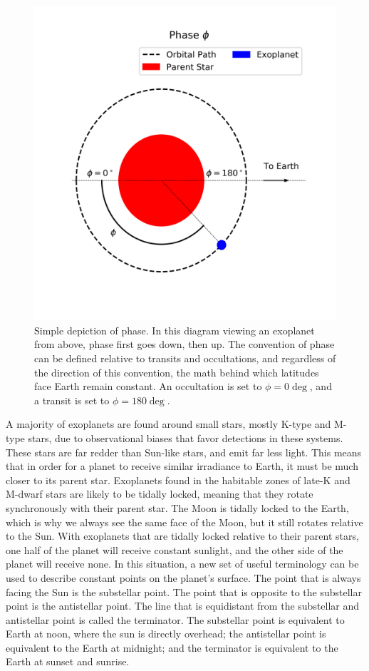 \begin{figure}[ht]
    \centering
    \includegraphics[width=5in]{background/phase_diagram.png}
    \caption[Definition of Phase]{Simple depiction of phase. In this diagram
    viewing an exoplanet from above, phase first goes down, then up.
    The convention of phase
    can be defined relative to transits and occultations, and regardless of the
    direction of this convention, the math behind which latitudes face Earth
    remain constant. An occultation is set to $\phi=0\deg$, and a transit is
    set to $\phi=180\deg$.}
    \label{phasediagram}
\end{figure}

A majority of exoplanets are found around small
 stars, mostly K-type and M-type stars, due to observational biases that favor
 detections in these systems. These stars are far redder than Sun-like stars,
 and emit far less light. This means that in order for a planet to receive
 similar irradiance to Earth, it must be much closer to its parent star. Exoplanets
 found in the habitable zones of late-K and M-dwarf stars are likely to be
 tidally locked, meaning that they rotate synchronously with their parent star.
 The Moon is tidally locked to the Earth, which is why we always see the same
 face of the Moon, but it still rotates relative to the Sun. With exoplanets
 that are tidally locked relative to their parent stars, one half of the planet
 will receive constant sunlight, and the other side of the planet will receive
 none. In this situation, a new set of useful terminology can be used to
 describe constant points on the planet's surface. The point that is always
 facing the Sun is the substellar point. The point that is opposite to the
 substellar point is the antistellar point. The line that is equidistant from
 the substellar and antistellar point is called the terminator. The substellar
 point is equivalent to Earth at noon, where the sun is directly overhead; the
 antistellar point is equivalent to the Earth at midnight; and the terminator
 is equivalent to the Earth at sunset and sunrise.

